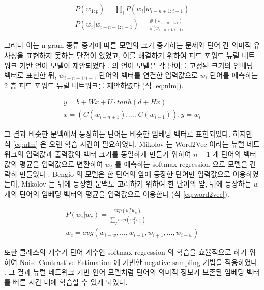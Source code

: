 \documentclass[11pt]{article}
\begin{document}
\begin{equation}
  \label{eq:slm}
  \begin{aligned}
  P(w_{1:p}) = \prod_i P(w_i \vert w_{i-n+1:i-1}) \\
  P(w_i \vert w_{i-n+1:i-1}) = \frac{\#(w_{i-n+1:i})}{\#(w_{i-n+1:i-1)}}
  \end{aligned}
\end{equation}

그러나 이는 n-gram 종류 증가에 따른 모델의 크기 증가하는 문제와 단어 간 의미적 유사성을 표현하지 못하는 단점이 있었고, 이를 해결하기 위하여 피드 포워드 뉴럴 네트워크 기반 언어 모델이 제안되었다 \citep{bengio2003neural}.
\citep{bengio2003neural} 의 언어 모델은 각 단어를 고정된 크기의 임베딩 벡터로 표현한 뒤, $w_{i-n-1:i-1}$ 단어의 벡터를 연결한 입력값으로 $w_i$ 단어를 예측하는 2 층 피드 포워드 뉴럴 네트워크를 제안하였다 (식 \ref{eq:nlm}).

\begin{equation}
  \label{eq:nlm}
  \begin{aligned}
  y = b + Wx + U \cdot tanh(d + Hx) \\
  x = (C(w_{i-n+1}), \dots, C(w_{i-1})), y = w_i
  \end{aligned}
\end{equation}

그 결과 비슷한 문맥에서 등장하는 단어는 비슷한 임베딩 벡터로 표현되었다.
하지만 식 \ref{eq:nlm} 은 오랜 학습 시간이 필요하였다.
Mikolov 는 Word2Vec 이라는 뉴럴 네트워크의 입력값과 출력값의 벡터 크기를 동일하게 만들기 위하여 $n-1$ 개 단어의 벡터값의 평균을 입력값으로 변환하여 $w_i$ 를 예측하는 softmax regression 으로 모델을 간략히 만들었다 \citep{mikolov2013efficient}.
Bengio 의 모델은 한 단어의 앞에 등장한 단어만 입력값으로 이용하였는데, Mikolov 는 뒤에 등장한 문맥도 고려하기 위하여 한 단어의 앞, 뒤에 등장하는 $w$ 개의 단어의 임베딩 벡터의 평균을 입력값으로 이용한다 (식 \ref{eq:word2vec}).

\begin{equation}
  \label{eq:word2vec}
  \begin{aligned}
  P(w_i \vert w_c) = \frac{exp(w_i^T w_c)}{\sum_j exp(w_j^T w_c)} \\
  w_c = avg(w_{i-w}, \dots, w_{i-1}, w_{i+1}, \dots, w_{i+w})
  \end{aligned}
\end{equation}

또한 클래스의 개수가 단어 개수인 softmax regression 의 학습을 효율적으로 하기 위하여 Noise Contrastive Estimation \citep{gutmann2010noise} 에 기반한 negative sampling 기법을 적용하였다 \citep{mikolov2013distributed}.
그 결과 뉴럴 네트워크 기반 언어 모델처럼 단어의 의미적 정보가 보존된 임베딩 벡터를 빠른 시간 내에 학습할 수 있게 되었다.
\end{document}
